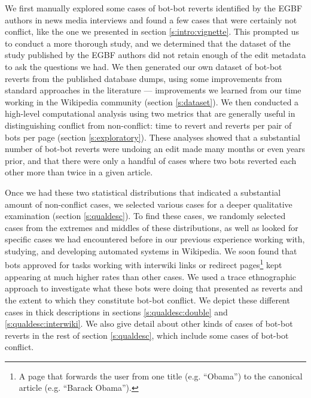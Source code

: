 \documentclass[format=acmsmall, review=false, screen=true]{acmart}%
\begin{document}
We first manually explored some cases of bot-bot reverts identified by the EGBF authors in news media interviews and found a few cases that were certainly not conflict, like the one we presented in section \ref{s:intro:vignette}. This prompted us to conduct a more thorough study, and we determined that the dataset of the study published by the EGBF authors did not retain enough of the edit metadata to ask the questions we had. We then generated our own dataset of bot-bot reverts from the published database dumps, using some improvements from standard approaches in the literature --- improvements we learned from our time working in the Wikipedia community (section \ref{s:dataset}). We then conducted a high-level computational analysis using two metrics that are generally useful in distinguishing conflict from non-conflict: time to revert and reverts per pair of bots per page (section \ref{s:exploratory}). These analyses showed that a substantial number of bot-bot reverts were undoing an edit made many months or even years prior, and that there were only a handful of cases where two bots reverted each other more than twice in a given article.

Once we had these two statistical distributions that indicated a substantial amount of non-conflict cases, we selected various cases for a deeper qualitative examination (section \ref{s:qualdesc}). To find these cases, we randomly selected cases from the extremes and middles of these distributions, as well as looked for specific cases we had encountered before in our previous experience working with, studying, and developing automated systems in Wikipedia. We soon found that bots approved for tasks working with interwiki links or redirect pages\footnote{ A page that forwards the user from one title (e.g. ``Obama'') to the canonical article (e.g. ``Barack Obama'').} kept appearing at much higher rates than other cases. We used a trace ethnographic approach to investigate what these bots were doing that presented as reverts and the extent to which they constitute bot-bot conflict. We depict these different cases in thick descriptions in sections \ref{s:qualdesc:double} and \ref{s:qualdesc:interwiki}. We also give detail about other kinds of cases of bot-bot reverts in the rest of section \ref{s:qualdesc}, which include some cases of bot-bot conflict.
\end{document}
